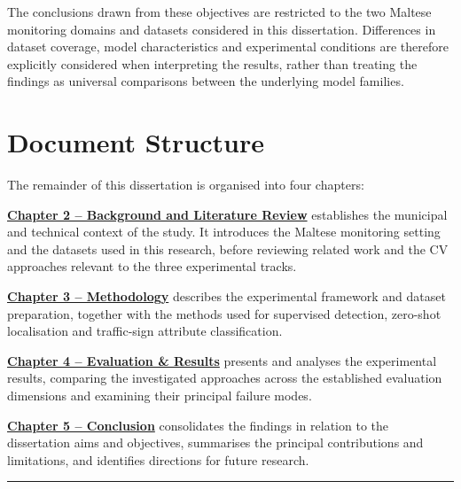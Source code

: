 \newpage
\noindent The conclusions drawn from these objectives are restricted to the two Maltese monitoring domains and datasets considered in this dissertation. Differences in dataset coverage, model characteristics and experimental conditions are therefore explicitly considered when interpreting the results, rather than treating the findings as universal comparisons between the underlying model families.

\section{Document Structure}
\label{sec:document-structure}
The remainder of this dissertation is organised into four chapters: \medskip

\noindent \textbf{\hyperref[ch:bg-lit]{Chapter 2 -- Background and Literature Review}} establishes the municipal and technical context of the study. It introduces the Maltese monitoring setting and the datasets used in this research, before reviewing related work and the \gls{CV} approaches relevant to the three experimental tracks. \medskip

\noindent \textbf{\hyperref[ch:methodology]{Chapter 3 -- Methodology}} describes the experimental framework and dataset preparation, together with the methods used for supervised detection, zero-shot localisation and traffic-sign attribute classification. \medskip

\noindent \textbf{\hyperref[ch:evaluation]{Chapter 4 -- Evaluation \& Results}} presents and analyses the experimental results, comparing the investigated approaches across the established evaluation dimensions and examining their principal failure modes. \medskip

\noindent \textbf{\hyperref[ch:conclusion]{Chapter 5 -- Conclusion}} consolidates the findings in relation to the dissertation aims and objectives, summarises the principal contributions and limitations, and identifies directions for future research.

\noindent\rule{\linewidth}{0.3pt}